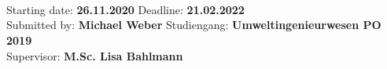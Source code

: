 
\begin{titlepage}
\enlargethispage{2.0cm}



\par
{}%
\hfill
{}%
\par


\begin{center}
\vspace{3.2cm}

{\Large {} }\\[0.5cm]
{\large {}} \\[0.2cm]
{\large {}}\\[3.2cm]


		
\end{center}

{\large Starting date: \textbf{26.11.2020}                    \hfill  \large Deadline: \textbf{21.02.2022}} \\[0.5cm]
{\large Submitted by:    \textbf{Michael Weber}                   \hfill   \large Studiengang:    \textbf{Umweltingenieurwesen PO 2019} } \\[0.5cm]
{\large Supervisor:    \textbf{M.Sc. Lisa Bahlmann}    } 

\end{titlepage}

